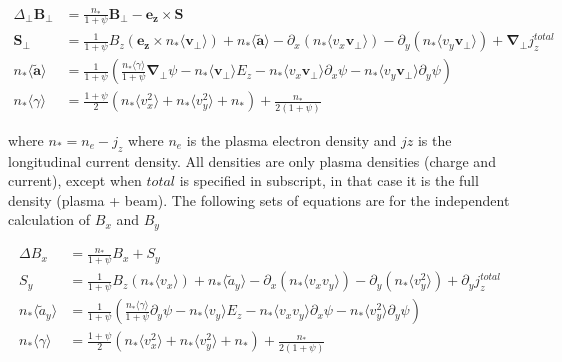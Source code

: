 \documentclass{article}
\begin{document}
\begin{subequations}
\begin{align}
\Delta_\perp \bm{B_\perp} &= \frac{n_*}{1+\psi} \bm{B_\perp} - \bm{e_z} \times \bm{S} \\
\bm{S}_\perp &= \frac{1}{1+\psi} B_z \left( \bm{e_z} \times n_* \langle\bm{v_\perp}\rangle \right) + n_* \langle \bm{\tilde{a}} \rangle - \partial_x\left( n_*\langle v_x\bm{v_\perp} \rangle \right) - \partial_y\left( n_*\langle v_y\bm{v_\perp} \rangle \right) + \bm{\nabla_\perp}j_z^{total} \\
n_* \langle \bm{\tilde{a}} \rangle &= \frac{1}{1+\psi} \left(  \frac{n_*\langle\gamma\rangle}{1+\psi}\bm{\nabla_\perp}\psi - n_* \langle \bm{v_\perp} \rangle E_z - n_* \langle v_x\bm{v_\perp}\rangle \partial_x\psi - n_* \langle v_y\bm{v_\perp}\rangle \partial_y\psi \right) \\
n_*\langle \gamma\rangle &= \frac{1+\psi}{2}\left(n_*\langle v_x^2\rangle + n_*\langle v_y^2\rangle + n_*\right) + \frac{n_*}{2(1+\psi)}
\end{align}
\end{subequations}

where $n_* = n_e - j_z$ where $n_e$ is the plasma electron density and $jz$ is the longitudinal current density. All densities are only plasma densities (charge and current), except when $total$ is specified in subscript, in that case it is the full density (plasma + beam). The following sets of equations are for the independent calculation of $B_x$ and $B_y$

\begin{subequations}
    \begin{align}
    \Delta B_x &= \frac{n_*}{1+\psi} B_x + S_y \\
    S_y &= \frac{1}{1+\psi} B_z \left(n_* \langle v_x\rangle \right) + n_* \langle \tilde{a}_y \rangle - \partial_x\left( n_*\langle v_x v_y \rangle \right) - \partial_y\left( n_*\langle v_y^2 \rangle \right) + \partial_y j_z^{total} \\
    n_* \langle \tilde{a}_y \rangle &= \frac{1}{1+\psi} \left(  \frac{n_*\langle\gamma\rangle}{1+\psi}\partial_y\psi - n_* \langle v_y \rangle E_z - n_* \langle v_x v_y\rangle \partial_x\psi - n_* \langle v_y^2 \rangle \partial_y\psi \right) \\
    n_*\langle \gamma\rangle &= \frac{1+\psi}{2}\left(n_*\langle v_x^2\rangle + n_*\langle v_y^2\rangle + n_*\right) + \frac{n_*}{2(1+\psi)}
    \end{align}
\end{subequations}
\end{document}
